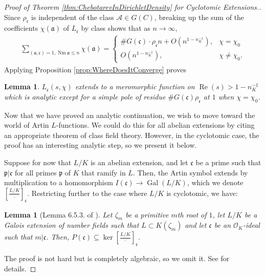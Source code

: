 \documentclass[12pt]{amsart}
\newtheorem{lem}[thm]{Lemma}
\theoremstyle{definition}
\theoremstyle{remark}
\numberwithin{equation}{section}
\newcommand{\sA}{\mathscr A}
\newcommand{\cO}{\mathcal O}
\newcommand{\fka}{\mathfrak a}
\newcommand{\fkc}{\mathfrak c}
\newcommand{\fkp}{\mathfrak p}
\DeclareMathOperator{\norm}{Nm}
\DeclareMathOperator{\re}{Re}
\newcommand{\inv}{^{-1}}
\newcommand{\artin}[2]{\left[ \frac{#1}{#2}\right]}
\DeclareMathOperator{\Gal}{Gal}
\begin{document}
\begin{proof}[Proof of Theorem \ref{thm:ChebotarevInDirichletDensity} for Cyclotomic Extensions.]
Since $\rho_{\fkc}$ is independent of the class $\sA \in G(C)$, breaking up the sum of the coefficients $\chi(\fka)$ of $L_{\fkc}$ by class shows that as $n \to \infty$,
\begin{align}
\sum_{(\fka, \fkc) = 1, \norm \fka \leq n} \chi(\fka) = \begin{cases}
\# G(\fkc) \cdot \rho_{\fkc} n + O(n^{1 - n_{K}\inv}), & \chi = \chi_{0} \\
O(n^{1 - n_{K}\inv}), & \chi \neq \chi_{0}.
\end{cases}
\end{align}
Applying Proposition \ref{prop:WhereDoesItConverge} proves
\begin{lem} \label{lem:MeromorphicContinuation}
$L_{\fkc}(s,\chi)$ extends to a meromorphic function on $\re(s) > 1 - n_{K}\inv$ which is analytic except for a simple pole of residue $\# G(\fkc) \rho_{\fkc}$ at $1$ when $\chi = \chi_{0}$.
\end{lem}

Now that we have proved an analytic continuation, we wish to move toward the world of Artin $L$-functions. We could do this for all abelian extensions by citing an appropriate theorem of class field theory. However, in the cyclotomic case, the proof has an interesting analytic step, so we present it below.

Suppose for now that $L/K$ is an abelian extension, and let $\fkc$ be a prime such that $\fkp|\fkc$ for all primes $\fkp$ of $K$ that ramify in $L$. Then, the Artin symbol extends by multiplication to a homomorphism $I(\fkc) \to \Gal(L/K)$, which we denote $\artin{L/K}{\cdot}_{\fkc}$. Restricting further to the case where $L/K$ is cyclotomic, we have:
\begin{lem}[Lemma 6.5.3. of \cite{FriedJarden08}] \label{lem:cyclotomic1}
Let $\zeta_{m}$ be a primitive $m$th root of $1$, let $L/K$ be a Galois extension of number fields such that $L \subset K(\zeta_{m})$ and let $\fkc$ be an $\cO_{K}$-ideal such that $m|\fkc$. Then, $P(\fkc) \subseteq \ker \artin{L/K}{\cdot}_{\fkc}$.
\end{lem}
The proof is not hard but is completely algebraic, so we omit it. See \cite{FriedJarden08} for details.


\end{proof}
\end{document}
